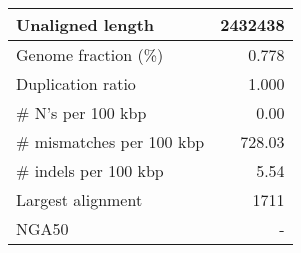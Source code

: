 \documentclass[12pt,a4paper]{article}
\begin{document}
\begin{table}[ht]
\begin{center}
\begin{tabular}{|l*{1}{|r}|}
Unaligned length & 2432438 \\ \hline
Genome fraction (\%) & 0.778 \\ \hline
Duplication ratio & 1.000 \\ \hline
\# N's per 100 kbp & 0.00 \\ \hline
\# mismatches per 100 kbp & 728.03 \\ \hline
\# indels per 100 kbp & 5.54 \\ \hline
Largest alignment & 1711 \\ \hline
NGA50 & - \\ \hline
\end{tabular}
\end{center}
\end{table}
\end{document}
